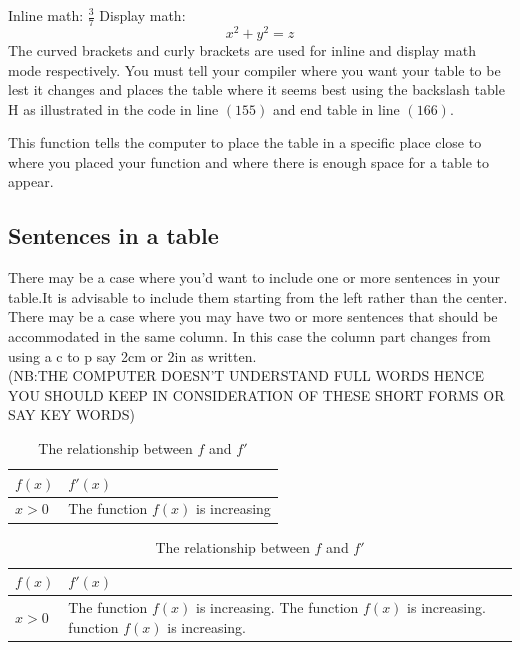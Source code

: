 \documentclass[a4paper,12pt]{article}
\begin{document}
  		 Inline math: \(\frac{3}{7}  \)
  		   		 Display math: \[x^2 +y^2 = z  \]The curved brackets and curly brackets are used for inline and display math mode respectively.
  		 You must tell your compiler where you want your table to be lest it changes and places the table where it seems best using the backslash table H as illustrated in the code in line  \(\left(155\right)\) and end table in line \(\left(166\right)\). 
  		 
  		 This function tells the computer to place the table in a specific place close to where you placed your function and where there is enough space for a table to appear.
  		 
  		 \subsection{Sentences in a table}
  		
  		There may be a case where you'd want to include one or more sentences in your table.It is advisable to include them starting from the left rather than the center.\\
  		There may be a case where you may have two or more sentences that should be accommodated in the same column. In this case the column part changes from using a c to p say 2cm or 2in as written.\\
  		
  		(NB:THE COMPUTER DOESN'T UNDERSTAND FULL WORDS HENCE YOU SHOULD KEEP IN CONSIDERATION OF THESE SHORT FORMS OR SAY KEY WORDS)
  		 \begin{table}
  		 	\centering
  		 	
  		 	\caption{The relationship between $f$ and  $f'$}
  		 	\begin{tabular}{|l|l|}
  		 		\hline
  		 		$f(x)$ & $f'(x)$\\ \hline
  		 		$x>0$ & The function $f(x)$ is increasing\\ \hline
  		 		
  		 		
  		 		\end{tabular}
  		 \end{table}
  		 
  		 
  		\vspace{40pt}
  		
  		  \begin{table}
  		 	\centering
  		 	
  		 	\caption{The relationship between $f$ and  $f'$}
  		 	\begin{tabular}{|l|p{3in}|}
  		 		\hline
  		 		$f(x)$ & $f'(x)$\\ \hline
  		 		$x>0$ & The function $f(x)$ is increasing.
  		 		The function $f(x)$ is increasing. function $f(x)$ is increasing.\\ \hline
  		 		
  		 	\end{tabular}
  		 \end{table}
  		 
\end{document}
